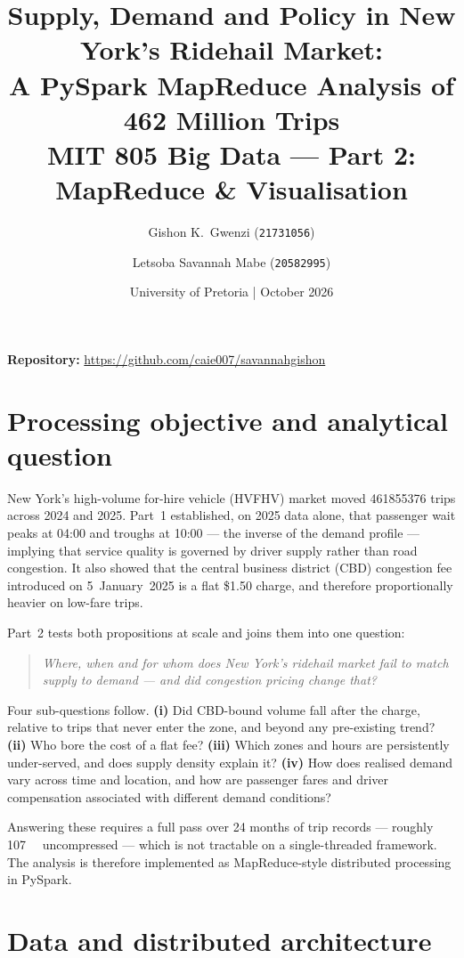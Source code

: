 \documentclass[10pt,a4paper]{article}
\title{\vspace{-2.6em}\textbf{Supply, Demand and Policy in New York's Ridehail Market:\\
A PySpark MapReduce Analysis of 462 Million Trips}\\[0.2em]
\normalsize MIT 805 Big Data --- Part 2: MapReduce \& Visualisation}
\author{\normalsize Gishon K.\ Gwenzi (\texttt{21731056}) \and
        \normalsize Letsoba Savannah Mabe (\texttt{20582995})}
\date{\vspace{-1em}\small University of Pretoria \quad|\quad 8 October 2026}
\begin{document}
\maketitle
\vspace{-2.9em}
\begin{center}\footnotesize
\textbf{Repository:} \url{https://github.com/caie007/savannahgishon}
\end{center}
\vspace{-0.5em}

\section{Processing objective and analytical question}

New York's high-volume for-hire vehicle (HVFHV) market moved \num{461855376}
trips across 2024 and 2025. Part~1 established, on 2025 data alone, that
passenger wait peaks at 04:00 and troughs at 10:00 --- the inverse of the demand
profile --- implying that service quality is governed by driver supply rather
than road congestion. It also showed that the central business district (CBD)
congestion fee introduced on 5~January~2025 is a flat \$1.50 charge, and
therefore proportionally heavier on low-fare trips.

Part~2 tests both propositions at scale and joins them into one question:

\begin{quote}
\emph{Where, when and for whom does New York's ridehail market fail to match
supply to demand --- and did congestion pricing change that?}
\end{quote}

Four sub-questions follow. \textbf{(i)} Did CBD-bound volume fall after the
charge, relative to trips that never enter the zone, and beyond any pre-existing
trend? \textbf{(ii)} Who bore the cost of a flat fee? \textbf{(iii)} Which zones
and hours are persistently under-served, and does supply density explain it?
\textbf{(iv)} How does realised demand vary across time and location, and how are
passenger fares and driver compensation associated with different demand
conditions?

Answering these requires a full pass over 24 months of trip records --- roughly
\SI{107}{\giga\byte} uncompressed --- which is not tractable on a single-threaded
framework. The analysis is therefore implemented as MapReduce-style distributed
processing in PySpark.

\section{Data and distributed architecture}
\end{document}
